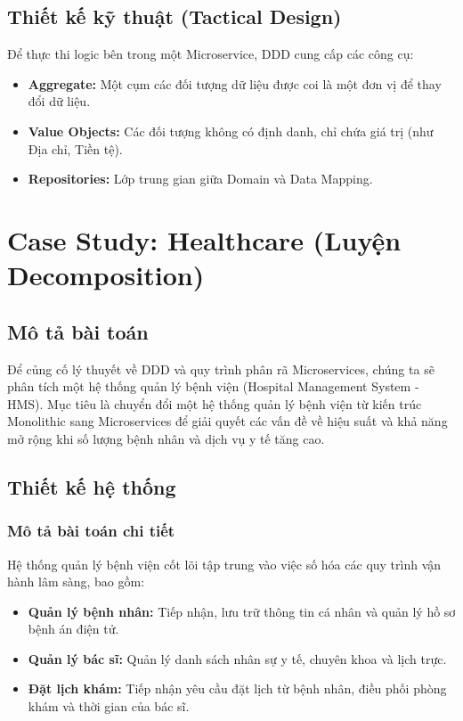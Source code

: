 \documentclass[12pt,a4paper]{report}
\begin{document}
\subsection{Thiết kế kỹ thuật (Tactical Design)}
Để thực thi logic bên trong một Microservice, DDD cung cấp các công cụ:
\begin{itemize}
    \item \textbf{Aggregate:} Một cụm các đối tượng dữ liệu được coi là một đơn vị để thay đổi dữ liệu.
    \item \textbf{Value Objects:} Các đối tượng không có định danh, chỉ chứa giá trị (như Địa chỉ, Tiền tệ).
    \item \textbf{Repositories:} Lớp trung gian giữa Domain và Data Mapping.
\end{itemize}

\section{Case Study: Healthcare (Luyện Decomposition)}
\subsection{Mô tả bài toán}
Để củng cố lý thuyết về DDD và quy trình phân rã Microservices, chúng ta sẽ phân tích một hệ thống quản lý bệnh viện (Hospital Management System - HMS). Mục tiêu là chuyển đổi một hệ thống quản lý bệnh viện từ kiến trúc Monolithic sang Microservices để giải quyết các vấn đề về hiệu suất và khả năng mở rộng khi số lượng bệnh nhân và dịch vụ y tế tăng cao.

\subsection{Thiết kế hệ thống}
\subsubsection{Mô tả bài toán chi tiết}
Hệ thống quản lý bệnh viện cốt lõi tập trung vào việc số hóa các quy trình vận hành lâm sàng, bao gồm:
\begin{itemize}
    \item \textbf{Quản lý bệnh nhân:} Tiếp nhận, lưu trữ thông tin cá nhân và quản lý hồ sơ bệnh án điện tử.
    \item \textbf{Quản lý bác sĩ:} Quản lý danh sách nhân sự y tế, chuyên khoa và lịch trực.
    \item \textbf{Đặt lịch khám:} Tiếp nhận yêu cầu đặt lịch từ bệnh nhân, điều phối phòng khám và thời gian của bác sĩ.
\end{itemize}
\end{document}
